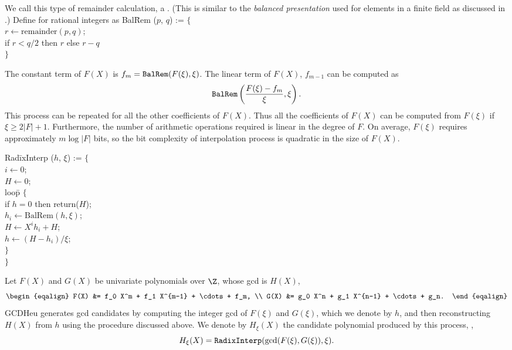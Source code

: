 We call this type of remainder calculation, a .  (This is similar to the {\em balanced presentation} used
for elements in a finite field as discussed in
.)  Define  for rational
integers as 
\begindsacode
Bal\=Rem ($p$, $q$) := $\{$ \\
\> $r \leftarrow \mbox{remainder}(p, q)$; \\
\> if $r < q/2$ then $r$ else $r - q$ \\
\> $\}$	
\enddsacode

The constant term of $F(X)$ is $f_m = \mbox{\tt BalRem}(F(\xi),
\xi)$.  The linear term of $F(X)$, $f_{m-1}$ can be computed as
\[
\mbox{\tt BalRem}\left( \frac{ F(\xi) - f_m}{\xi}, \xi\right).
\]
This process can be repeated for all the other coefficients of $F(X)$.
Thus all the coefficients of $F(X)$ can be computed from $F(\xi)$ if
$\xi \ge 2 |F| + 1$.  Furthermore, the number of arithmetic operations
required is linear in the degree of $F$.  On average, $F(\xi)$ requires
approximately $m \log |F|$ bits, so the bit complexity of
interpolation process is quadratic in the size of $F(X)$.

\begindsacode
Rad\=ixInterp ($h$, $\xi$) := $\{$ \\
\> $i \leftarrow 0$; \\
\> $H \leftarrow 0$; \\
\> loo\=p $\{$ \\
\>\> if $h = 0$ then return($H$); \\
\>\> $h_i \leftarrow \mbox{BalRem}(h, \xi)$; \\
\>\> $H \leftarrow X^i h_i + H$; \\
\>\> $h \leftarrow (H - h_i)/\xi$; \\
\>\> $\}$ \\
\> $\}$
\enddsacode

\medskip
Let $F(X)$ and $G(X)$ be univariate polynomials over $\Z$, whose {\sc gcd}
is $H(X)$,
\[
\begin{eqalign}
F(X) &= f_0 X^m + f_1 X^{m-1} + \cdots + f_m, \\
G(X) &= g_0 X^n + g_1 X^{n-1} + \cdots + g_n.
\end{eqalign}
\]
GCDHeu generates {\sc gcd} candidates by computing the integer {\sc gcd} of
$F(\xi)$ and $G(\xi)$, which we denote by $h$, and then reconstructing
$H(X)$ from $h$ using the procedure discussed above.  We denote by
$H_{\xi}(X)$ the candidate polynomial produced by this process, \ie,
\[
H_{\xi}(X) = \mbox{\tt RadixInterp}(\gcd(F(\xi), G(\xi)), \xi).
\]

